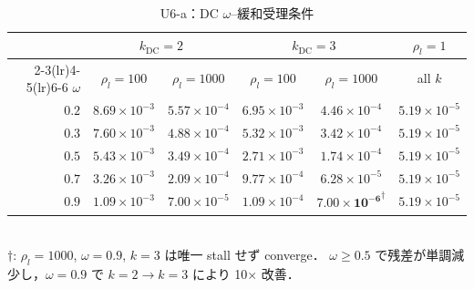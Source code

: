 \begin{table}[!ht]
\caption{U6-a：DC \texorpdfstring{$\omega$}{omega}--緩和受理条件}
\label{tab:U6_dc_omega}
\centering\small
\begin{tabular}{r c c c c c}
\toprule
 & \multicolumn{2}{c}{$k_{\mathrm{DC}}=2$} & \multicolumn{2}{c}{$k_{\mathrm{DC}}=3$} & $\rho_l=1$ \\
\cmidrule(lr){2-3}\cmidrule(lr){4-5}\cmidrule(lr){6-6}
$\omega$ & $\rho_l\!=\!100$ & $\rho_l\!=\!1000$ & $\rho_l\!=\!100$ & $\rho_l\!=\!1000$ & all $k$ \\
\midrule
$0.2$ & $8.69\!\times\!10^{-3}$ & $5.57\!\times\!10^{-4}$ & $6.95\!\times\!10^{-3}$ & $4.46\!\times\!10^{-4}$ & $5.19\!\times\!10^{-5}$ \\
$0.3$ & $7.60\!\times\!10^{-3}$ & $4.88\!\times\!10^{-4}$ & $5.32\!\times\!10^{-3}$ & $3.42\!\times\!10^{-4}$ & $5.19\!\times\!10^{-5}$ \\
$0.5$ & $5.43\!\times\!10^{-3}$ & $3.49\!\times\!10^{-4}$ & $2.71\!\times\!10^{-3}$ & $1.74\!\times\!10^{-4}$ & $5.19\!\times\!10^{-5}$ \\
$0.7$ & $3.26\!\times\!10^{-3}$ & $2.09\!\times\!10^{-4}$ & $9.77\!\times\!10^{-4}$ & $6.28\!\times\!10^{-5}$ & $5.19\!\times\!10^{-5}$ \\
$0.9$ & $1.09\!\times\!10^{-3}$ & $7.00\!\times\!10^{-5}$ & $1.09\!\times\!10^{-4}$ & $\mathbf{7.00\!\times\!10^{-6}}^{\dagger}$ & $5.19\!\times\!10^{-5}$ \\
\bottomrule
\end{tabular}
\\[2pt]
{\footnotesize $\dagger$: $\rho_l=1000$, $\omega=0.9$, $k=3$ は唯一 stall せず converge．
$\omega \ge 0.5$ で残差が単調減少し，$\omega=0.9$ で $k=2 \to k=3$ により 10$\times$ 改善．}
\end{table}

